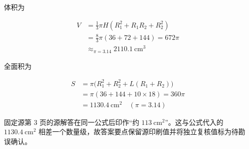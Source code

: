\begin{answer}
体积为

\nopagebreak[4]
\[
\begin{aligned}
V&=\frac13\pi H(R_1^2+R_1R_2+R_2^2)\\
&=\frac83\pi(36+72+144)=672\pi\\
&\mathrel{\mathop\approx}_{\pi=3.14}2110.1\ \mathrm{cm^3}
\end{aligned}
\]

全面积为

\nopagebreak[4]
\[
\begin{aligned}
S&=\pi\bigl(R_1^2+R_2^2+L(R_1+R_2)\bigr)\\
&=\pi(36+144+10\times18)=360\pi\\
&=1130.4\ \mathrm{cm^2}\quad(\pi=3.14)
\end{aligned}
\]

固定源第 3 页的源解答在同一公式后印作“约 $113\ \mathrm{cm^2}$”。这与公式代入的 $1130.4\ \mathrm{cm^2}$ 相差一个数量级，故答案要点保留源印刷值并将独立复核值标为待勘误确认。



\end{answer}
